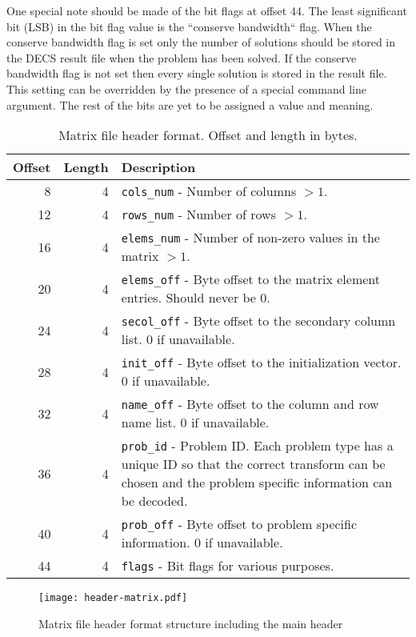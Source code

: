 One special note should be made of the bit flags at offset 44.
The least significant bit (LSB) in the bit flag value is the ``conserve bandwidth`` flag.
When the conserve bandwidth flag is set only the number of solutions should be stored in the DECS result file when the problem has been solved.
If the conserve bandwidth flag is not set then every single solution is stored in the result file.
This setting can be overridden by the presence of a special command line argument.
The rest of the bits are yet to be assigned a value and meaning.

\begin{table}[htbp]
	\centering
	\begin{tabular}{|r|r|p{3.2in}|}
		\hline
		\bf Offset & \bf Length & \bf Description \\ \hline
		8  & 4 & \texttt{cols\_num} - Number of columns $> 1$. \\ \hline
		12 & 4 & \texttt{rows\_num} - Number of rows $> 1$. \\ \hline
		16 & 4 & \texttt{elems\_num} - Number of non-zero values in the matrix $> 1$. \\ \hline
		20 & 4 & \texttt{elems\_off} - Byte offset to the matrix element entries. Should never be 0. \\ \hline
		24 & 4 & \texttt{secol\_off} - Byte offset to the secondary column list. 0 if unavailable. \\ \hline
		28 & 4 & \texttt{init\_off} -  Byte offset to the initialization vector. 0 if unavailable. \\ \hline
		32 & 4 & \texttt{name\_off} - Byte offset to the column and row name list. 0 if unavailable. \\ \hline
		36 & 4 & \texttt{prob\_id} - Problem ID. Each problem type has a unique ID so that the correct transform can be chosen and the problem specific information can be decoded. \\ \hline
		40 & 4 & \texttt{prob\_off} - Byte offset to problem specific information. 0 if unavailable. \\ \hline
		44 & 4 & \texttt{flags} - Bit flags for various purposes. \\ \hline
	\end{tabular}
	\caption{Matrix file header format. Offset and length in bytes.}
	\label{tab:header-matrix}
\end{table}

\begin{figure}[htbp]
	\centering
	\texttt{[image: header-matrix.pdf]}
	\caption{Matrix file header format structure including the main header}
	\label{fig:header-matrix}
\end{figure}


